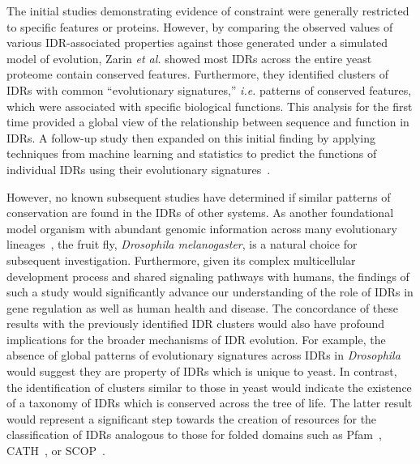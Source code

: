 The initial studies demonstrating evidence of constraint were generally restricted to specific features or proteins. However, by comparing the observed values of various IDR-associated properties against those generated under a simulated model of evolution, Zarin \textit{et al.} showed most IDRs across the entire yeast proteome contain conserved features. Furthermore, they identified clusters of IDRs with common ``evolutionary signatures,'' \textit{i.e.} patterns of conserved features, which were associated with specific biological functions. This analysis for the first time provided a global view of the relationship between sequence and function in IDRs. A follow-up study then expanded on this initial finding by applying techniques from machine learning and statistics to predict the functions of individual IDRs using their evolutionary signatures~\cite{Zarin2021}.

However, no known subsequent studies have determined if similar patterns of conservation are found in the IDRs of other systems. As another foundational model organism with abundant genomic information across many evolutionary lineages~\cite{Yang2018, Miller2018, Kim2021, Gramates2022}, the fruit fly, \textit{Drosophila melanogaster}, is a natural choice for subsequent investigation. Furthermore, given its complex multicellular development process and shared signaling pathways with humans, the findings of such a study would significantly advance our understanding of the role of IDRs in gene regulation as well as human health and disease. The concordance of these results with the previously identified IDR clusters would also have profound implications for the broader mechanisms of IDR evolution. For example, the absence of global patterns of evolutionary signatures across IDRs in \textit{Drosophila} would suggest they are property of IDRs which is unique to yeast. In contrast, the identification of clusters similar to those in yeast would indicate the existence of a taxonomy of IDRs which is conserved across the tree of life. The latter result would represent a significant step towards the creation of resources for the classification of IDRs analogous to those for folded domains such as Pfam~\cite{Mistry2020}, CATH~\cite{Sillitoe2020}, or SCOP~\cite{Andreeva2013, Andreeva2019}.

